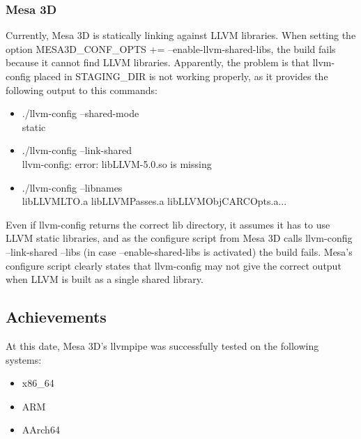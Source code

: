 \documentclass[12pt,a4paper,oneside]{article}
\begin{document}
\subsubsection*{Mesa 3D}
Currently, Mesa 3D is statically linking against LLVM libraries. When setting the
option {\selectfont MESA3D\_CONF\_OPTS += --enable-llvm-shared-libs},
the build fails because it cannot find LLVM libraries. Apparently, the problem is
that llvm-config placed in STAGING\_DIR is not working properly, as it provides
the following output to this commands:
\begin{itemize}
  \item {\selectfont./llvm-config --shared-mode\\
        static}
  \item {\selectfont./llvm-config --link-shared\\
        llvm-config: error: libLLVM-5.0.so is missing}

  \item {\selectfont./llvm-config --libnames\\
        libLLVMLTO.a libLLVMPasses.a libLLVMObjCARCOpts.a...}
\end{itemize}
Even if llvm-config returns the correct lib directory, it assumes it has to use
LLVM static libraries, and as the configure script from Mesa 3D calls
{\selectfont llvm-config --link-shared --libs} (in case
{\selectfont --enable-shared-libs} is activated) the build
fails. Mesa's configure script clearly states that llvm-config may not give
the correct output when LLVM is built as a single shared library.

\subsection*{Achievements}
At this date, Mesa 3D's llvmpipe was successfully tested on the following systems:
\begin{itemize}
  \item x86\_64
  \item ARM
  \item AArch64
\end{itemize}
\end{document}

